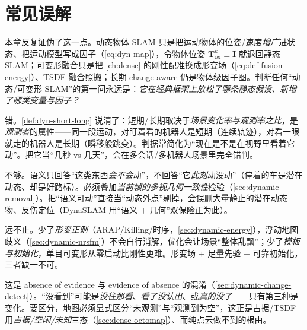 \section{常见误解}
\label{sec:dynamic-myths}

\begin{pitfall}
本章反复证伪了这一点。动态物体 SLAM 只是把运动物体的位姿/速度\emph{增广}进状态、把运动模型写成因子（\cref{eq:dyn-map}），令物体位姿 $\mathbf{T}_{wi}^{k}\equiv\mathbf{I}$ 就退回静态 SLAM；可变形融合只是把 \cref{ch:dense} 的刚性配准换成形变场（\cref{eq:def-fusion-energy}）、TSDF 融合照搬；长期 change-aware 仍是物体级因子图。判断任何“动态/可变形 SLAM”的第一问永远是：\emph{它在经典框架上放松了哪条静态假设、新增了哪类变量与因子？}
\end{pitfall}

\begin{pitfall}
错。\cref{def:dyn-short-long} 说清了：短期/长期取决于\emph{场景变化率与观测率之比}，是\emph{观测者}的属性——同一段运动，对盯着看的机器人是短期（连续轨迹），对看一眼就走的机器人是长期（瞬移般跳变）。判据常简化为“现在是不是在视野里看着它动”。把它当“几秒 vs 几天”，会在多会话/多机器人场景里完全错判。
\end{pitfall}

\begin{pitfall}
不够。语义只回答“这类东西\emph{会不会}动”，不回答“它\emph{此刻}动没动”（停着的车是潜在动态、却是好路标）。必须叠加\emph{当前帧的多视几何一致性}检验（\cref{sec:dynamic-removal}）。把“语义可动”直接当“动态外点”剔掉，会误删大量静止的潜在动态物、反伤定位（DynaSLAM 用“语义 $+$ 几何”双保险正为此）。
\end{pitfall}

\begin{pitfall}
远不止。少了\emph{形变正则}（ARAP/Killing/时序，\cref{sec:dynamic-energy}），浮动地图歧义（\cref{sec:dynamic-nrsfm}）不会自行消解，优化会让场景“整体乱飘”；少了\emph{模板与初始化}，单目可变形从零启动比刚性更难。形变场 $+$ 足量先验 $+$ 可靠初始化，三者缺一不可。
\end{pitfall}

\begin{pitfall}
这是 absence of evidence 与 evidence of absence 的混淆（\cref{sec:dynamic-change-detect}）。“没看到”可能是\emph{没往那看}、\emph{看了没认出}、或\emph{真的没了}——只有第三种是变化。要区分，地图必须显式区分“未观测”与“观测到为空”，这正是占据/TSDF 用\emph{占据/空闲/未知}三态（\cref{sec:dense-octomap}）、而纯点云做不到的根由。
\end{pitfall}

